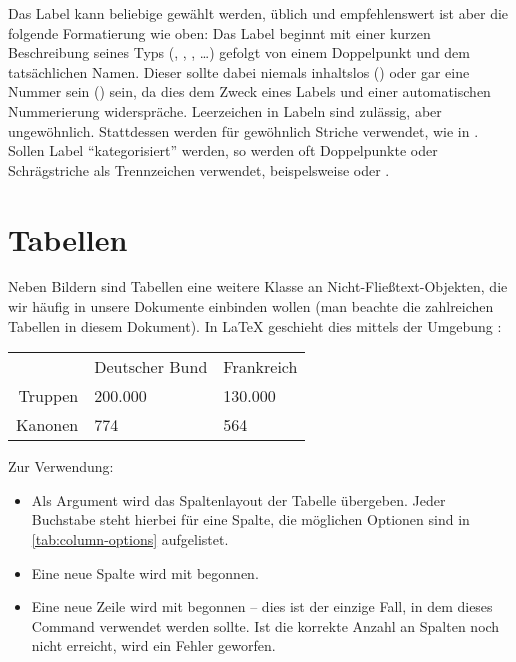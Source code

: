Das Label kann beliebige gewählt werden, üblich und empfehlenswert ist aber die folgende Formatierung wie oben:
Das Label beginnt mit einer kurzen Beschreibung seines Typs (, , , \dots) gefolgt von einem Doppelpunkt und dem tatsächlichen Namen.
Dieser sollte dabei niemals inhaltslos () oder gar eine Nummer sein () sein, da dies dem Zweck eines Labels und einer automatischen Nummerierung widerspräche.
Leerzeichen in Labeln sind zulässig, aber ungewöhnlich.
Stattdessen werden für gewöhnlich Striche verwendet, wie in .
Sollen Label \enquote{kategorisiert} werden, so werden oft Doppelpunkte oder Schrägstriche als Trennzeichen verwendet, beispelsweise  oder .


\section{Tabellen}
Neben Bildern sind Tabellen eine weitere Klasse an Nicht-Fließtext-Objekten, die wir häufig in unsere Dokumente einbinden wollen (man beachte die zahlreichen Tabellen in diesem Dokument).
In \LaTeX{} geschieht dies mittels der Umgebung :
\begin{latexlisting}
	\begin{tabular}{r l l}
		& Deutscher Bund & Frankreich \\
		Truppen & 200.000 & 130.000 \\
		Kanonen & 774 & 564
	\end{tabular}
\end{latexlisting}
Zur Verwendung:
\begin{itemize}
	\item Als Argument wird das Spaltenlayout der Tabelle übergeben.
	Jeder Buchstabe steht hierbei für eine Spalte, die möglichen Optionen sind in \autoref{tab:column-options} aufgelistet.
	\item Eine neue Spalte wird mit \latexargument{\&} begonnen.
	\item Eine neue Zeile wird mit \latexcommand{\textbackslash} begonnen -- dies ist der einzige Fall, in dem dieses Command verwendet werden sollte.
	Ist die korrekte Anzahl an Spalten noch nicht erreicht, wird ein Fehler geworfen.
\end{itemize}

